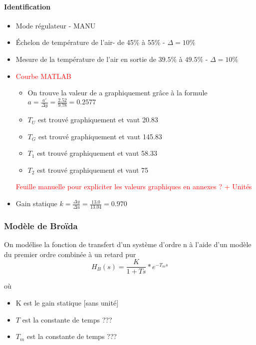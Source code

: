 \paragraph{Identification}
\begin{itemize}
\item Mode régulateur - MANU
\item Échelon de température de l'air- de 45\% à 55\% - $\Delta = 10\%$
\item Mesure de la température de l'air en sortie de $39.5\%$ à $49.5\%$ - $\Delta = 10\%$

\item \textcolor{red}{Courbe MATLAB}
\begin{itemize}
\item On trouve la valeur de a graphiquement grâce à la formule $a = \frac{a'}{\Delta y} = \frac{2.52}{9.78} = 0.2577$

\item $T_{U}$ est trouvé graphiquement et vaut 20.83 

\item $T_{G}$ est trouvé graphiquement et vaut 145.83

\item $T_{1}$ est trouvé graphiquement et vaut 58.33

\item $T_{2}$ est trouvé graphiquement et vaut 75
\end{itemize}
\textcolor{red}{Feuille manuelle pour expliciter les valeurs graphiques en annexes ? + Unités}

\item Gain statique $k = \frac{\Delta y}{\Delta u} = \frac{13.0}{13.04} = 0.970 $
\end{itemize}

\subsubsection{Modèle de Broïda}
On modélise la fonction de transfert d'un système d'ordre n à l'aide d'un modèle du premier ordre combinée à un retard pur
\begin{equation}
H_{B}(s) = \frac{K}{1 + Ts}*e^{-T_{m}s}
\end{equation}

où 
\begin{itemize}
\item K est le gain statique [sans unité]
\item $T$ est la constante de temps ???
\item $T_{m}$ est la constante de temps ???
\end{itemize}

